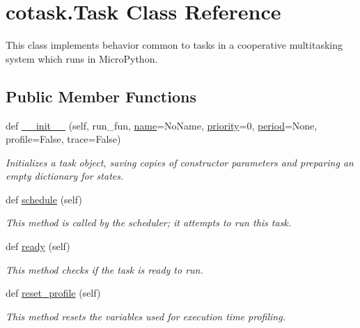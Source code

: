 \hypertarget{classcotask_1_1Task}{}\section{cotask.\+Task Class Reference}
\label{classcotask_1_1Task}


This class implements behavior common to tasks in a cooperative multitasking system which runs in Micro\+Python.  


\subsection*{Public Member Functions}
\begin{DoxyCompactItemize}
\item 
def \hyperlink{classcotask_1_1Task_a20a30d252e750706e77553a6244ae457}{\+\_\+\+\_\+init\+\_\+\+\_\+} (self, run\+\_\+fun, \hyperlink{classcotask_1_1Task_ab54e069dd0b4f0a2f8e7f00c94998a10}{name}=\textquotesingle{}No\+Name\textquotesingle{}, \hyperlink{classcotask_1_1Task_aeced93c7b7d23e33de9693d278aef88b}{priority}=0, \hyperlink{classcotask_1_1Task_a44f980f61f1908764c6821fa886590ca}{period}=None, profile=False, trace=False)
\begin{DoxyCompactList}\small\item\em Initializes a task object, saving copies of constructor parameters and preparing an empty dictionary for states. \end{DoxyCompactList}\item 
def \hyperlink{classcotask_1_1Task_a7c5bee1f632d4f71fd5ca02852b430a5}{schedule} (self)
\begin{DoxyCompactList}\small\item\em This method is called by the scheduler; it attempts to run this task. \end{DoxyCompactList}\item 
def \hyperlink{classcotask_1_1Task_af9c086f64b9d3e3bb209d582dcc431a4}{ready} (self)
\begin{DoxyCompactList}\small\item\em This method checks if the task is ready to run. \end{DoxyCompactList}\item 
def \hyperlink{classcotask_1_1Task_a1bcbfa7dd7086112af20b7247ffa4a2e}{reset\+\_\+profile} (self)
\begin{DoxyCompactList}\small\item\em This method resets the variables used for execution time profiling. \end{DoxyCompactList}\item 

\end{DoxyCompactItemize}
